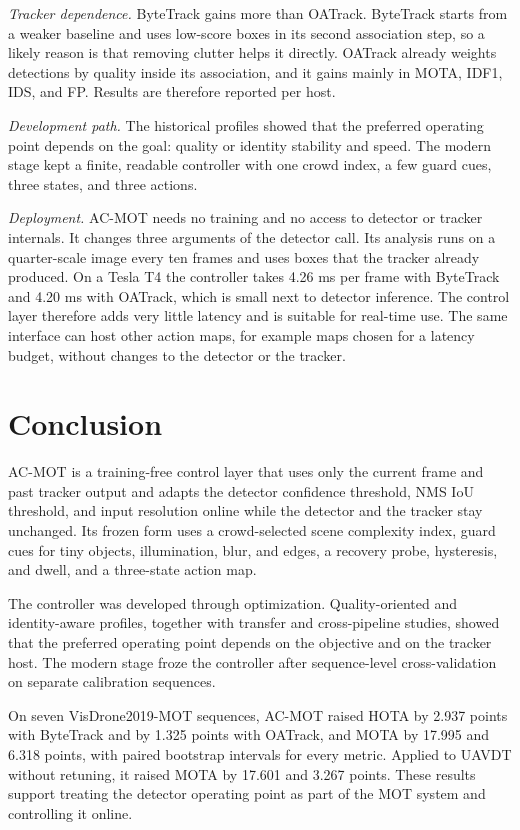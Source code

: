 \documentclass[pdflatex,sn-mathphys-num,iicol]{sn-jnl}
\begin{document}
\emph{Tracker dependence.} ByteTrack gains more than OATrack. ByteTrack starts
from a weaker baseline and uses low-score boxes in its second association
step, so a likely reason is that removing clutter helps it directly. OATrack
already weights detections by quality inside its association, and it gains
mainly in MOTA, IDF1, IDS, and FP. Results are therefore reported per host.

\emph{Development path.} The historical profiles showed that the preferred
operating point depends on the goal: quality or identity stability and speed.
The modern stage kept a finite, readable controller with one crowd index, a few
guard cues, three states, and three actions.

\emph{Deployment.} AC-MOT needs no training and no access to detector or
tracker internals. It changes three arguments of the detector call. Its
analysis runs on a quarter-scale image every ten frames and uses boxes that
the tracker already produced. On a Tesla T4 the controller takes 4.26 ms per
frame with ByteTrack and 4.20 ms with OATrack, which is small next to detector
inference. The control layer therefore adds very little latency and is
suitable for real-time use. The same interface can host other action maps, for
example maps chosen for a latency budget, without changes to the detector or
the tracker.
\section{Conclusion}\label{sec:conclusion}

AC-MOT is a training-free control layer that uses only the current frame and
past tracker output and adapts the detector
confidence threshold, NMS IoU threshold, and input resolution online while the
detector and the tracker stay unchanged. Its frozen form uses a crowd-selected
scene complexity index, guard cues for tiny objects, illumination, blur, and
edges, a recovery probe, hysteresis, and dwell, and a three-state action map.

The controller was developed through optimization. Quality-oriented and
identity-aware profiles, together with transfer and cross-pipeline studies,
showed that the preferred operating point depends on the objective and on the
tracker host. The modern stage froze the controller after sequence-level
cross-validation on separate calibration sequences.

On seven VisDrone2019-MOT sequences, AC-MOT raised HOTA by 2.937 points with
ByteTrack and by 1.325 points with OATrack, and MOTA by 17.995 and 6.318
points, with paired bootstrap intervals for every metric. Applied to UAVDT
without retuning, it raised MOTA by 17.601 and 3.267 points. These results
support treating the detector operating point as part of the MOT system and
controlling it online.
\end{document}
